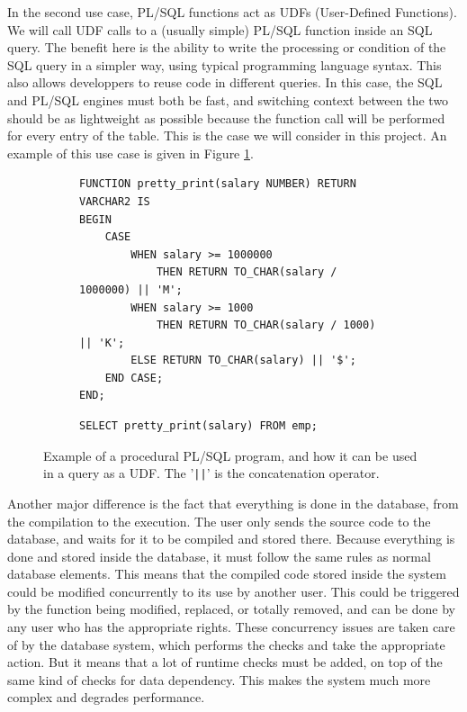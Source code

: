 \documentclass[twoside,11pt,a4paper]{article}
\newcommand{\sql}[1]{\texttt{#1}}
\begin{document}
In the second use case, PL/SQL functions act as UDFs (User-Defined Functions). We will call UDF calls to a (usually simple) PL/SQL function inside an SQL query. The benefit here is the ability to write the processing or condition of the SQL query in a simpler way, using typical programming language syntax. This also allows developpers to reuse code in different queries. In this case, the SQL and PL/SQL engines must both be fast, and switching context between the two should be as lightweight as possible because the function call will be performed for every entry of the table. This is the case we will consider in this project. An example of this use case is given in Figure \ref{fig:plsudfexample}.

\begin{figure}[tb]
	\begin{subfigure}[h]{\textwidth}
		\begin{lstlisting}[style=PLSQL, frame=L]
FUNCTION pretty_print(salary NUMBER) RETURN VARCHAR2 IS
BEGIN
	CASE
		WHEN salary >= 1000000
			THEN RETURN TO_CHAR(salary / 1000000) || 'M';
		WHEN salary >= 1000
			THEN RETURN TO_CHAR(salary / 1000) || 'K';
		ELSE RETURN TO_CHAR(salary) || '$';
	END CASE;
END;
		\end{lstlisting}
	\end{subfigure}
	
	\begin{subfigure}[h]{\textwidth}
		\begin{lstlisting}[style=SQL]
SELECT pretty_print(salary) FROM emp;
		\end{lstlisting}
	\end{subfigure}
	
	\caption[Example of a procedural PL/SQL program, and how it can be used in a query as a UDF]{Example of a procedural PL/SQL program, and how it can be used in a query as a UDF. The '\sql{||}' is the concatenation operator.}
	\label{fig:plsudfexample}
\end{figure}

Another major difference is the fact that everything is done in the database, from the compilation to the execution. The user only sends the source code to the database, and waits for it to be compiled and stored there. Because everything is done and stored inside the database, it must follow the same rules as normal database elements. This means that the compiled code stored inside the system could be modified concurrently to its use by another user. This could be triggered by the function being modified, replaced, or totally removed, and can be done by any user who has the appropriate rights. These concurrency issues are taken care of by the database system, which performs the checks and take the appropriate action. But it means that a lot of runtime checks must be added, on top of the same kind of checks for data dependency. This makes the system much more complex and degrades performance.
\end{document}

